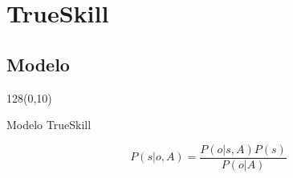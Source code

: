 \documentclass[shownotes]{beamer}
\begin{document}
\section{TrueSkill}
% 
%  
% 
%      
%  


\subsection{Modelo}

\begin{frame}

\begin{textblock}{128}(0,10)
\begin{center}
 \large Modelo TrueSkill
\end{center}
\end{textblock}
\vspace{0.5cm}

\begin{figure}[H]
  \scalebox{.85}{}
  \label{modelo_trueskill}
\end{figure}

\begin{equation}
 P(s|o,A) = \frac{P(o|s,A)P(s)}{P(o|A)}
\end{equation}


\end{frame}
\end{document}
